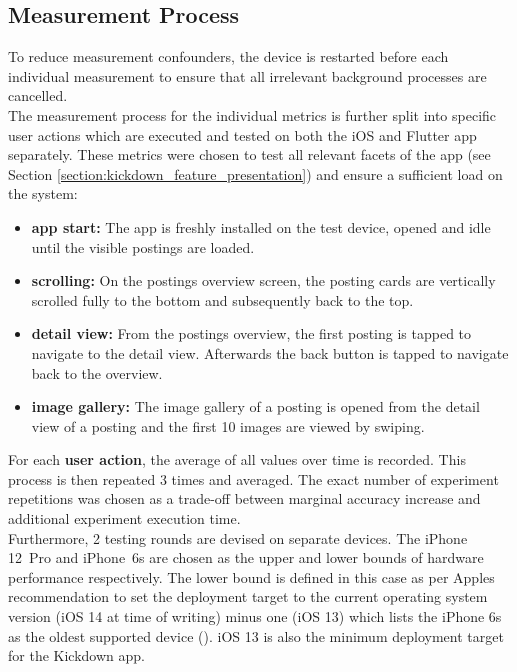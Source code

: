 \subsection{Measurement Process} \label{subsection::measurement_process}
To reduce measurement confounders, the device is restarted before each individual measurement to ensure that all
irrelevant background processes are cancelled.\\
The measurement process for the individual metrics is further split into specific user actions
which are executed and tested on both the iOS and Flutter app separately. These metrics were chosen
to test all relevant facets of the app (see Section \ref{section:kickdown_feature_presentation}) and ensure a sufficient load on the system:
\begin{itemize}
    \item \textbf{app start:} The app is freshly installed on the test device, opened and idle until the visible postings are loaded.
    \item \textbf{scrolling:} On the postings overview screen, the posting cards are vertically scrolled fully to the bottom and subsequently back to the top.
    \item \textbf{detail view:} From the postings overview, the first posting is tapped to navigate to the detail view. Afterwards the back button is tapped to navigate back to the overview.
    \item \textbf{image gallery:} The image gallery of a posting is opened from the detail view of a posting and the first 10 images are viewed by swiping.
\end{itemize}
For each \textbf{user action}, the average of all values over time is recorded. This process is then
repeated 3 times and averaged. The exact number of experiment repetitions was chosen as a
trade-off between marginal accuracy increase and additional experiment execution time.\\
Furthermore, 2 testing rounds are devised on separate devices. The iPhone 12~Pro and iPhone~6s are chosen as the upper and lower bounds of hardware performance respectively. The lower
bound is defined in this case as per Apples recommendation to set the deployment target to the
current operating system version (iOS 14 at time of writing) minus one (iOS 13) which lists the
iPhone 6s as the oldest supported device (\cite{Apple2021}). iOS 13 is also the minimum deployment target for the Kickdown app.\\

